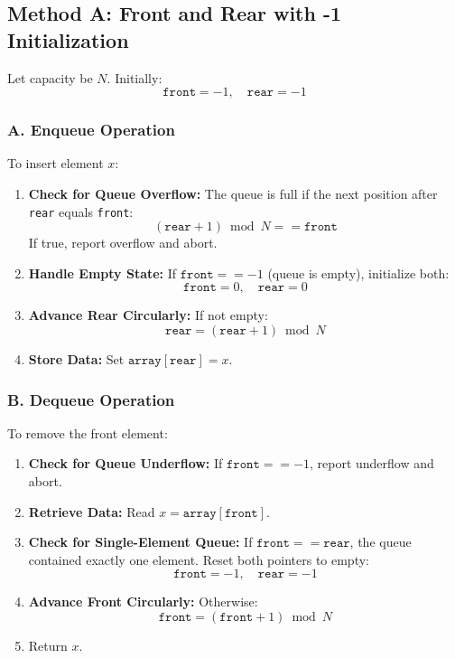 \subsection{Method A: Front and Rear with -1 Initialization}

Let capacity be $N$. Initially:
\[
\texttt{front} = -1, \quad \texttt{rear} = -1
\]

\subsubsection{A. Enqueue Operation}
To insert element $x$:
\begin{enumerate}
    \item \textbf{Check for Queue Overflow:} The queue is full if the next position after \texttt{rear} equals \texttt{front}:
    \[
    (\texttt{rear} + 1) \bmod N == \texttt{front}
    \]
    If true, report overflow and abort.
    \item \textbf{Handle Empty State:} If $\texttt{front} == -1$ (queue is empty), initialize both:
    \[
    \texttt{front} = 0, \quad \texttt{rear} = 0
    \]
    \item \textbf{Advance Rear Circularly:} If not empty:
    \[
    \texttt{rear} = (\texttt{rear} + 1) \bmod N
    \]
    \item \textbf{Store Data:} Set $\texttt{array}[\texttt{rear}] = x$.
\end{enumerate}

\subsubsection{B. Dequeue Operation}
To remove the front element:
\begin{enumerate}
    \item \textbf{Check for Queue Underflow:} If $\texttt{front} == -1$, report underflow and abort.
    \item \textbf{Retrieve Data:} Read $x = \texttt{array}[\texttt{front}]$.
    \item \textbf{Check for Single-Element Queue:} If $\texttt{front} == \texttt{rear}$, the queue contained exactly one element. Reset both pointers to empty:
    \[
    \texttt{front} = -1, \quad \texttt{rear} = -1
    \]
    \item \textbf{Advance Front Circularly:} Otherwise:
    \[
    \texttt{front} = (\texttt{front} + 1) \bmod N
    \]
    \item Return $x$.
\end{enumerate}

